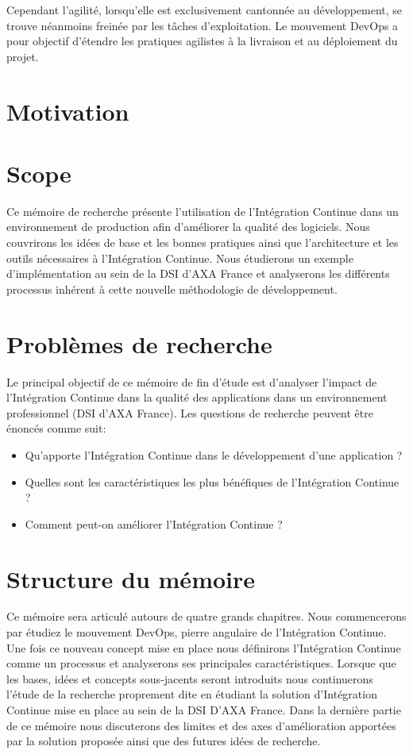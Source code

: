 \documentclass{report}
\begin{document}
  Cependant l’agilité, lorsqu’elle est exclusivement cantonnée au développement, se trouve néanmoins freinée par les tâches d’exploitation. Le mouvement DevOps a pour objectif d’étendre les pratiques agilistes à la livraison et au déploiement du projet.

    \section{Motivation}

    \section{Scope}
    Ce mémoire de recherche présente l'utilisation de l'Intégration Continue dans un environnement de production afin d'améliorer la qualité des logiciels. Nous couvrirons les idées de base et les bonnes pratiques ainsi que l'architecture et les outils nécessaires à l'Intégration Continue. Nous étudierons un exemple d'implémentation au sein de la DSI d'AXA France et analyserons les différents processus inhérent à cette nouvelle méthodologie de développement.

    \section{Problèmes de recherche}
    Le principal objectif de ce mémoire de fin d'étude est d'analyser l'impact de l'Intégration Continue dans la qualité des applications dans un environnement professionnel (DSI d'AXA France). Les questions de recherche peuvent être énoncés comme suit:\\
    \begin{itemize}
      \item Qu'apporte l'Intégration Continue dans le développement d'une application ?
      \item Quelles sont les caractéristiques les plus bénéfiques de l'Intégration Continue ?
      \item Comment peut-on améliorer l'Intégration Continue ?\\
    \end{itemize}

    \section{Structure du mémoire}
    Ce mémoire sera articulé autours de quatre grands chapitres. Nous commencerons par étudiez le mouvement DevOps, pierre angulaire de l'Intégration Continue. Une fois ce nouveau concept mise en place nous définirons l'Intégration Continue comme un processus et analyserons ses principales caractéristiques. Lorsque que les bases, idées et concepts sous-jacents seront introduits nous continuerons l'étude de la recherche proprement dite en étudiant la solution d'Intégration Continue mise en place au sein de la DSI D'AXA France. Dans la dernière partie de ce mémoire nous discuterons des limites et des axes d'amélioration apportées par la solution proposée ainsi que des futures idées de recherche.
\end{document}
